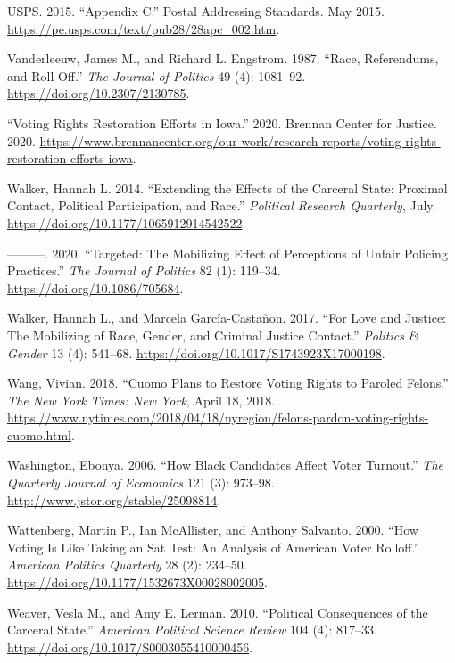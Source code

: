 \documentclass[
  12pt,
]{article}
\newlength{\cslhangindent}
\newenvironment{cslreferences}%
  {\setlength{\parindent}{0pt}%
  \everypar{\setlength{\hangindent}{\cslhangindent}}\ignorespaces}%
  {\par}
\begin{document}
\begin{cslreferences}
\leavevmode\hypertarget{ref-USPS2015}{}%
USPS. 2015. ``Appendix C.'' Postal Addressing Standards. May 2015. \url{https://pe.usps.com/text/pub28/28apc_002.htm}.

\leavevmode\hypertarget{ref-Vanderleeuw1987}{}%
Vanderleeuw, James M., and Richard L. Engstrom. 1987. ``Race, Referendums, and Roll-Off.'' \emph{The Journal of Politics} 49 (4): 1081--92. \url{https://doi.org/10.2307/2130785}.

\leavevmode\hypertarget{ref-bcj_iowa}{}%
``Voting Rights Restoration Efforts in Iowa.'' 2020. Brennan Center for Justice. 2020. \url{https://www.brennancenter.org/our-work/research-reports/voting-rights-restoration-efforts-iowa}.

\leavevmode\hypertarget{ref-Walker2014}{}%
Walker, Hannah L. 2014. ``Extending the Effects of the Carceral State: Proximal Contact, Political Participation, and Race.'' \emph{Political Research Quarterly}, July. \url{https://doi.org/10.1177/1065912914542522}.

\leavevmode\hypertarget{ref-Walker2020}{}%
---------. 2020. ``Targeted: The Mobilizing Effect of Perceptions of Unfair Policing Practices.'' \emph{The Journal of Politics} 82 (1): 119--34. \url{https://doi.org/10.1086/705684}.

\leavevmode\hypertarget{ref-Walker2017}{}%
Walker, Hannah L., and Marcela García-Castañon. 2017. ``For Love and Justice: The Mobilizing of Race, Gender, and Criminal Justice Contact.'' \emph{Politics \& Gender} 13 (4): 541--68. \url{https://doi.org/10.1017/S1743923X17000198}.

\leavevmode\hypertarget{ref-Wang2018}{}%
Wang, Vivian. 2018. ``Cuomo Plans to Restore Voting Rights to Paroled Felons.'' \emph{The New York Times: New York}, April 18, 2018. \url{https://www.nytimes.com/2018/04/18/nyregion/felons-pardon-voting-rights-cuomo.html}.

\leavevmode\hypertarget{ref-Washington2006}{}%
Washington, Ebonya. 2006. ``How Black Candidates Affect Voter Turnout.'' \emph{The Quarterly Journal of Economics} 121 (3): 973--98. \url{http://www.jstor.org/stable/25098814}.

\leavevmode\hypertarget{ref-Wattenberg2000}{}%
Wattenberg, Martin P., Ian McAllister, and Anthony Salvanto. 2000. ``How Voting Is Like Taking an Sat Test: An Analysis of American Voter Rolloff.'' \emph{American Politics Quarterly} 28 (2): 234--50. \url{https://doi.org/10.1177/1532673X00028002005}.

\leavevmode\hypertarget{ref-Weaver2010}{}%
Weaver, Vesla M., and Amy E. Lerman. 2010. ``Political Consequences of the Carceral State.'' \emph{American Political Science Review} 104 (4): 817--33. \url{https://doi.org/10.1017/S0003055410000456}.


\end{cslreferences}
\end{document}
